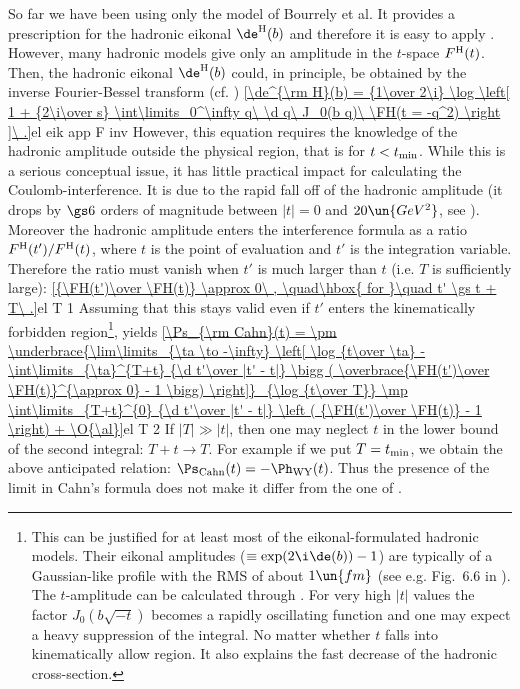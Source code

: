 So far we have been using only the model of Bourrely et al. It provides a prescription for the hadronic eikonal $\de^{\rm H}(b)$ and therefore it is easy to apply . However, many hadronic models give only an amplitude in the $t$-space $F^{\rm H}(t)$. Then, the hadronic eikonal $\de^{\rm H}(b)$ could, in principle, be obtained by the inverse Fourier-Bessel transform (cf. )
\eqref{\de^{\rm H}(b) = {1\over 2\i} \log \left[ 1 + {2\i\over s} \int\limits_0^\infty q\ \d q\ J_0(b q)\ \FH(t = -q^2)  \right ]\ .}{el eik app F inv}
However, this equation requires the knowledge of the hadronic amplitude outside the physical region, that is for $t < t_{\rm min}$.
While this is a serious conceptual issue, it has little practical impact for calculating the Coulomb-interference. It is due to the rapid fall off of the hadronic amplitude (it drops by $\gs 6$ orders of magnitude between $|t|=0$ and $20\un{GeV^2}$, see ). Moreover the hadronic amplitude enters the interference formula  as a ratio $F^{\rm H}(t') / F^{\rm H}(t)$, where $t$ is the point of evaluation and $t'$ is the integration variable. Therefore the ratio must vanish when $t'$ is much larger than $t$ (i.e. $T$ is sufficiently large):
\eqref{{\FH(t')\over \FH(t)} \approx 0\ , \quad\hbox{ for }\quad t' \gs t + T\ .}{el T 1}
Assuming that this stays valid even if $t'$ enters the kinematically forbidden region\footnote{%
This can be justified for at least most of the eikonal-formulated hadronic models. Their eikonal amplitudes ($\equiv \exp(2\i\de(b)) - 1$) are typically of a Gaussian-like profile with the RMS of about $1\un{fm}$ (see e.g. Fig.~6.6 in ). The $t$-amplitude can be calculated through . For very high $|t|$ values the factor $J_0(b\sqrt{-t})$ becomes a rapidly oscillating function and one may expect a heavy suppression of the integral. No matter whether $t$ falls into kinematically allow region. It also explains the fast decrease of the hadronic cross-section. 
},  yields
\eqref{\Ps_{\rm Cahn}(t) =
\pm \underbrace{\lim\limits_{\ta \to -\infty} \left[
	\log {t\over \ta}
	- \int\limits_{\ta}^{T+t} {\d t'\over |t' - t|} \bigg ( \overbrace{\FH(t')\over \FH(t)}^{\approx 0} - 1 \bigg)
\right]}_{\log {t\over T}}
\mp \int\limits_{T+t}^{0} {\d t'\over |t' - t|} \left ( {\FH(t')\over \FH(t)} - 1 \right)
+ \O{\al}}{el T 2}
If $|T| \gg |t|$, then one may neglect $t$ in the lower bound of the second integral: $T+t\rightarrow T$. For example if we put $T=t_{\rm min}$, we obtain the above anticipated relation: $\Ps_{\rm Cahn}(t) = - \Ph_{\rm WY}(t)$. Thus the presence of the limit in Cahn's formula does not make it differ from the one of \WaY.

